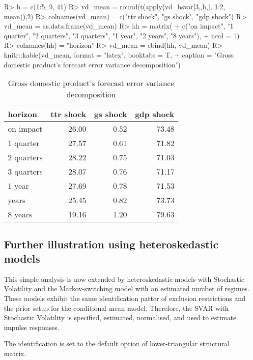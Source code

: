 \documentclass[
  nojss]{jss}
\begin{document}
\begin{CodeChunk}
\begin{CodeInput}
R> h         = c(1:5, 9, 41)
R> vd_mean   = round(t(apply(vd_bsvar[3,,h,], 1:2, mean)),2)
R> colnames(vd_mean) = c("ttr shock", "gs shock", "gdp shock")
R> vd_mean   = as.data.frame(vd_mean)
R> hh        = matrix(
+   c("on impact", "1 quarter", "2 quarters", "3 quarters", "1 year", "2 years", "8 years"), 
+   ncol = 1)
R> colnames(hh) = "horizon"
R> vd_mean   = cbind(hh, vd_mean)
R> knitr::kable(vd_mean, format = "latex", booktabs = T,
+              caption = "Gross domestic product's forecast error variance decomposition")
\end{CodeInput}
\begin{table}

\caption{\label{tab:report fevd}Gross domestic product's forecast error variance decomposition}
\centering
\begin{tabular}[t]{lrrr}
\toprule
horizon & ttr shock & gs shock & gdp shock\\
\midrule
on impact & 26.00 & 0.52 & 73.48\\
1 quarter & 27.57 & 0.61 & 71.82\\
2 quarters & 28.22 & 0.75 & 71.03\\
3 quarters & 28.07 & 0.76 & 71.17\\
1 year & 27.69 & 0.78 & 71.53\\
\addlinespace
2 years & 25.45 & 0.82 & 73.73\\
8 years & 19.16 & 1.20 & 79.63\\
\bottomrule
\end{tabular}
\end{table}

\end{CodeChunk}

\subsection{Further illustration using heteroskedastic models}

This simple analysis is now extended by heteroskedastic models with
Stochastic Volatility and the Markov-switching model with an estimated
number of regimes. These models exhibit the same identification patter
of exclusion restrictions and the prior setup for the conditional mean
model. Therefore, the SVAR with Stochastic Volatility is specified,
estimated, normalised, and used to estimate impulse responses.

\begin{CodeChunk}
\begin{CodeOutput}
The identification is set to the default option of lower-triangular structural matrix.
\end{CodeOutput}
\end{CodeChunk}
\end{document}
